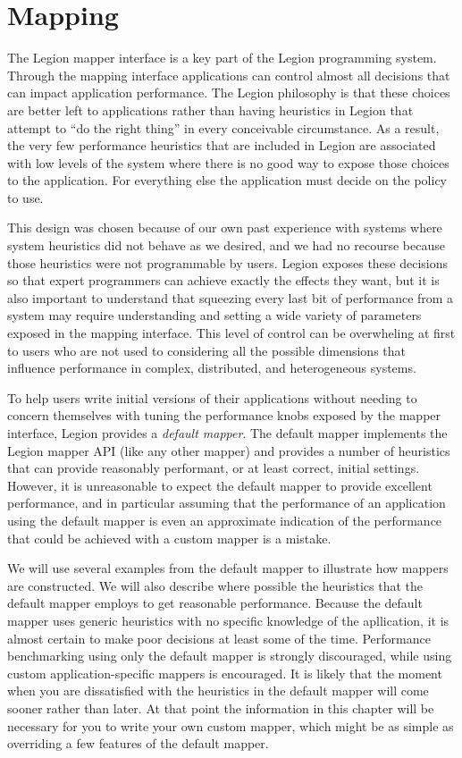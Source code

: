 \chapter{Mapping}
\label{chap:mapping}
The Legion mapper interface is a key part
of the Legion programming system. Through the mapping interface applications
can control almost all decisions that can impact application performance.
The Legion philosophy is that these choices are better left to applications
rather than having heuristics in Legion that attempt to ``do the right thing'' in
every conceivable circumstance.  As a result, the very few performance heuristics
that are included in Legion are associated with low levels of the system
where there is no good way to expose those choices to the application.
For everything else the application must decide on the policy to use.

This design was chosen because of our own past experience with systems
where system heuristics did not behave as we desired, and we had no recourse
because those heuristics were not programmable by users.
Legion exposes these decisions so that expert programmers can achieve exactly
the effects they want, but it is also important to understand that squeezing every last bit of performance from a system may require understanding
and setting a wide variety of parameters exposed in the mapping interface.
This level of control can be overwheling at first to users who are not used to
considering all the possible dimensions that influence performance in complex,
distributed, and heterogeneous systems.

To help users write initial versions of their applications without needing
to concern themselves with tuning the performance knobs exposed by the mapper
interface, Legion provides a {\em default mapper}.  The default mapper
implements the Legion mapper API (like any other mapper) and provides a number
of heuristics that can provide reasonably performant, or at least correct, initial
settings.  However, it is unreasonable to expect the default mapper to provide excellent performance, and in
particular assuming that the performance of an application using the default
mapper is even an approximate indication of the performance that could be
achieved with a custom mapper is a mistake.


We will use several examples from the default mapper
to illustrate how mappers are constructed. We will also describe where
possible the heuristics that the default mapper employs to get 
reasonable performance. Because the default mapper uses generic heuristics
with no specific knowledge of the apllication, it is almost certain to make
poor decisions at least some of the time.
Performance benchmarking using only the default mapper is strongly
discouraged, while using custom application-specific mappers is
encouraged.  It is likely that the moment when you are dissatisfied with the 
heuristics in the default mapper will come sooner rather than later.
At that point the information in this chapter will be necessary for you
to write your own custom mapper, which might be as simple as
overriding a few features of the default mapper.

